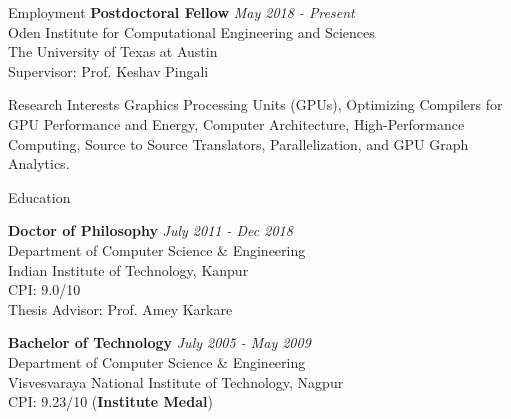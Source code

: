 \documentclass{resume} %
\begin{document}
\begin{rSection}{Employment}
{\bf Postdoctoral Fellow } \hfill {\em May 2018 - Present} \\ 
Oden Institute for Computational Engineering and Sciences \\
The University of Texas at Austin \\
Supervisor: Prof. Keshav Pingali
\end{rSection}

\begin{rSection}{Research Interests}
Graphics Processing Units (GPUs), Optimizing Compilers for GPU Performance and Energy, Computer Architecture, High-Performance Computing, Source to Source Translators, Parallelization, and  GPU Graph Analytics.
\end{rSection}


\begin{rSection}{Education}



{\bf Doctor of Philosophy} \hfill {\em July 2011 - Dec 2018} \\ 
Department of Computer Science \& Engineering \\
Indian Institute of Technology, Kanpur \\
CPI: 9.0/10 \\
Thesis Advisor: Prof. Amey Karkare


{\bf Bachelor of Technology} \hfill {\em July 2005 - May 2009}  \\
Department of Computer Science \& Engineering \\
Visvesvaraya National Institute of Technology, Nagpur \\
CPI: 9.23/10 (\textbf{Institute Medal})


\end{rSection}
\end{document}
